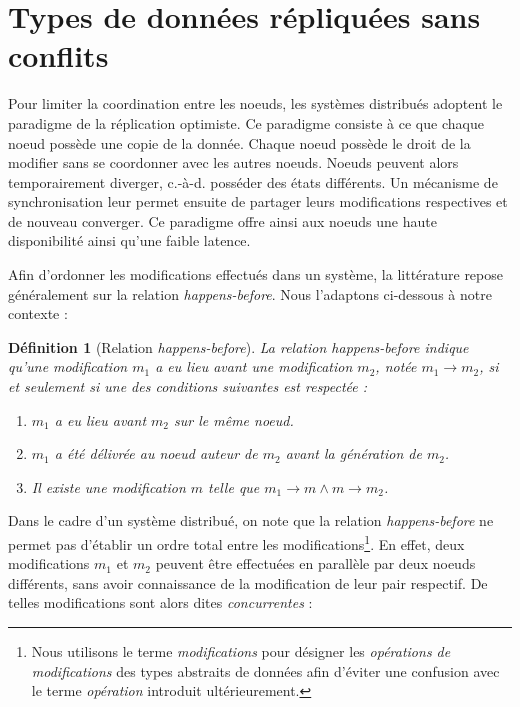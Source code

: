 \documentclass[12pt]{thesul}
\newtheorem{definition}{Définition}
\newcommand{\ie}{c.-à-d. }
\newcommand{\hb}{\emph{happens-before}\xspace}
\begin{document}


\section{Types de données répliquées sans conflits}

Pour limiter la coordination entre les noeuds, les systèmes distribués adoptent le paradigme de la réplication optimiste.
Ce paradigme consiste à ce que chaque noeud possède une copie de la donnée.
Chaque noeud possède le droit de la modifier sans se coordonner avec les autres noeuds.
Noeuds peuvent alors temporairement diverger, \ie posséder des états différents.
Un mécanisme de synchronisation leur permet ensuite de partager leurs modifications respectives et de nouveau converger.
Ce paradigme offre ainsi aux noeuds une haute disponibilité  ainsi qu'une faible latence.

Afin d'ordonner les modifications effectués dans un système, la littérature repose généralement sur la relation \hb \cite{1978-happen-before-lamport}.
Nous l'adaptons ci-dessous à notre contexte :

\begin{definition}[Relation \hb]
  La relation \hb indique qu'une modification $m_1$ a eu lieu avant une modification $m_2$, notée $m_1 \rightarrow m_2$, si et seulement si une des conditions suivantes est respectée :
  \begin{enumerate}[label=(\roman*)]
    \item $m_1$ a eu lieu avant $m_2$ sur le même noeud.
    \item $m_1$ a été délivrée au noeud auteur de $m_2$ avant la génération de $m_2$.
    \item Il existe une modification $m$ telle que $m_1 \rightarrow m \wedge m \rightarrow m_2$.
  \end{enumerate}
\end{definition}

Dans le cadre d'un système distribué, on note que la relation \hb ne permet pas d'établir un ordre total entre les modifications\footnote{Nous utilisons le terme \emph{modifications} pour désigner les \emph{opérations de modifications} des types abstraits de données afin d'éviter une confusion avec le terme \emph{opération} introduit ultérieurement.}.
En effet, deux modifications $m_1$ et $m_2$ peuvent être effectuées en parallèle par deux noeuds différents, sans avoir connaissance de la modification de leur pair respectif.
De telles modifications sont alors dites \emph{concurrentes} :
\end{document}
